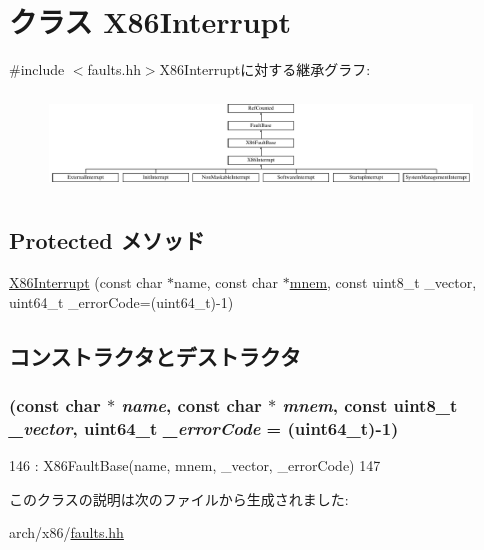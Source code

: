 \hypertarget{classX86ISA_1_1X86Interrupt}{
\section{クラス X86Interrupt}
\label{classX86ISA_1_1X86Interrupt}
}


{\ttfamily \#include $<$faults.hh$>$}X86Interruptに対する継承グラフ:\begin{figure}[H]
\begin{center}
\leavevmode
\includegraphics[height=2.60708cm]{classX86ISA_1_1X86Interrupt}
\end{center}
\end{figure}
\subsection*{Protected メソッド}
\begin{DoxyCompactItemize}
\item 
\hyperlink{classX86ISA_1_1X86Interrupt_a60250d1ba111921df6feeef7f1b5e27f}{X86Interrupt} (const char $\ast$name, const char $\ast$\hyperlink{classX86ISA_1_1X86FaultBase_a7bb17f43dadf35d103ef6a25b64c4e9f}{mnem}, const uint8\_\-t \_\-vector, uint64\_\-t \_\-errorCode=(uint64\_\-t)-\/1)
\end{DoxyCompactItemize}


\subsection{コンストラクタとデストラクタ}
\hypertarget{classX86ISA_1_1X86Interrupt_a60250d1ba111921df6feeef7f1b5e27f}{
\subsubsection[{X86Interrupt}]{ (const char $\ast$ {\em name}, \/  const char $\ast$ {\em mnem}, \/  const uint8\_\-t {\em \_\-vector}, \/  uint64\_\-t {\em \_\-errorCode} = {\ttfamily (uint64\_\-t)-\/1})}}
\label{classX86ISA_1_1X86Interrupt_a60250d1ba111921df6feeef7f1b5e27f}



\begin{DoxyCode}
146             : X86FaultBase(name, mnem, _vector, _errorCode)
147         {}
\end{DoxyCode}


このクラスの説明は次のファイルから生成されました:\begin{DoxyCompactItemize}
\item 
arch/x86/\hyperlink{arch_2x86_2faults_8hh}{faults.hh}\end{DoxyCompactItemize}
